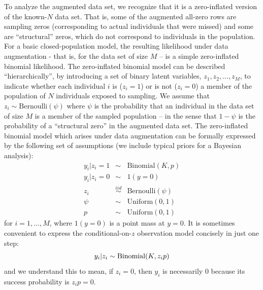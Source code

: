 To analyze the augmented data set, we recognize that it is a
zero-inflated version of the known-$N$ data set. That is, some of the
augmented all-zero rows are sampling zeros (corresponding to actual
individuals that were missed) and some are ``structural'' zeros, which
do not correspond to individuals in the population. For a basic
closed-population model, the resulting likelihood under data
augmentation - that is, for the data set of size $M$ -- is a simple
zero-inflated binomial likelihood.  The zero-inflated binomial model
can be described ``hierarchically'', by introducing a set of binary
latent variables, $z_{1},z_{2},\ldots, z_{M}$, to indicate whether
each individual $i$ is ($z_i=1$) or is not ($z_i=0$) a member of the
population of $N$ individuals exposed to sampling. We assume that
$z_{i} \sim \mbox{Bernoulli}(\psi)$ where $\psi$ is the probability that an
individual in the data set of size $M$ is a member of the sampled
population -- in the sense that $1-\psi$ is the probability of
a
``structural zero'' in the augmented data set.  The
zero-inflated binomial model which arises under data augmentation can
be formally expressed by the following set of assumptions (we include
typical priors for a Bayesian analysis):
\begin{eqnarray*}
 y_{i}|{z_{i}=1} & \sim  &\mbox{Binomial}(K, p) \\
 y_{i}|{z_{i}=0} & \sim &  1(y=0)  \\
 z_{i} & \stackrel{iid}{\sim} & \mbox{Bernoulli}(\psi) \\
 \psi & \sim & \mathrm{Uniform}(0,1) \\
 p & \sim & \mathrm{Uniform}(0,1)
\end{eqnarray*}
for $i=1, \ldots, M$, where $1(y=0)$ is a point mass at
$y=0$.
It is sometimes convenient to express the conditional-on-$z$
observation model concisely in
just one step:
\[
 y_{i}|z_{i}  \sim  \mbox{Binomial}(K, z_{i} p) \\
\]
and we understand this to mean, if $z_{i}=0$, then $y_{i}$ is
necessarily 0 because its success probability is $z_{i} p = 0$.

